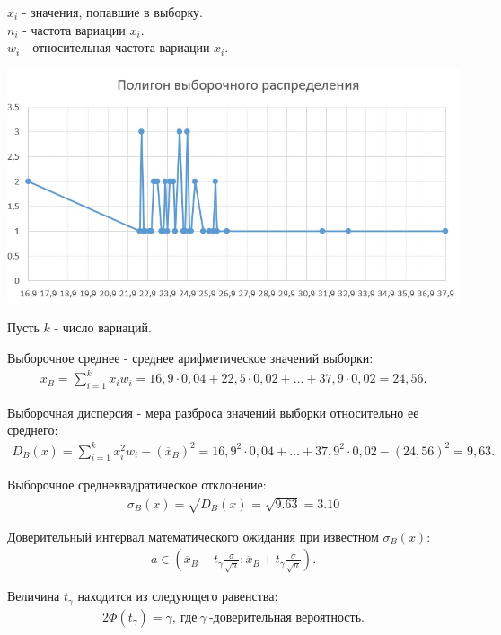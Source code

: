 \documentclass[utf8, a4paper, 14pt, russian, oneside]{book}
\begin{document}
$x_i$ - значения, попавшие в выборку.\\
$n_i$ - частота вариации $x_i$.\\
$w_i$ - относительная частота вариации $x_i$.

{
\centering
\includegraphics[scale=0.75]{img/poligon.jpg}
}

Пусть $k$ - число вариаций.

Выборочное среднее - среднее арифметическое значений выборки:
\begin{align*}
    \overline{x}_B = \sum\limits_{i=1}^{k}x_i w_i = 16,9 \cdot 0,04 + 22,5 \cdot 0,02 + \ldots + 37,9 \cdot 0,02 = 24,56.
\end{align*}

Выборочная дисперсия - мера разброса значений выборки относительно ее среднего:
\begin{align*}
    D_B(x) = \sum\limits_{i=1}^{k}x_i^2w_i - (\overline{x}_B)^2 = 16,9^2 \cdot 0,04 + \ldots + 37,9^2 \cdot 0,02 - (24,56)^2 = 9,63.
\end{align*}

Выборочное среднеквадратическое отклонение:
\begin{align*}
    \sigma_B(x) = \sqrt{{D_B(x)}} = \sqrt{9.63} = 3.10
\end{align*}
\newpage

Доверительный интервал математического ожидания при известном $\sigma_B(x)$:
\begin{align*}
    a \in \left( \overline{x}_B - t_{\gamma}\frac{\sigma}{\sqrt{n}}; \overline{x}_B + t_{\gamma}\frac{\sigma}{\sqrt{n}} \right).
\end{align*}

Величина $t_{\gamma}$ находится из следующего равенства:
\begin{align*}
    2\Phi(t_\gamma) = \gamma,\  \text{где}\  \gamma\ \text{-доверительная вероятность.}
\end{align*}
\end{document}
